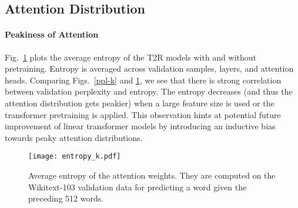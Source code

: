 \documentclass[11pt,a4paper]{article}
\newcommand{\TRNN}{T2R\xspace}
\begin{document}
\subsection{Attention Distribution}
\paragraph{Peakiness of Attention}
Fig.\ \ref{fig:entropy-kernel} plots the average entropy of the \TRNN models with and without pretraining.
Entropy is averaged across validation samples, layers, and attention heads.
Comparing Figs.\ \ref{ppl-k} and \ref{fig:entropy-kernel}, we see that there is strong correlation between validation perplexity and entropy.
The entropy decreases (and thus the attention distribution gets peakier) when a large feature size is used or the transformer pretraining is applied.
This observation hints at potential future improvement of linear transformer models by introducing an inductive bias towards peaky attention distributions.

\begin{figure}[h]
\centering
    \texttt{[image: entropy\_k.pdf]}
\caption{Average entropy of the attention weights. They are computed on the Wikitext-103 validation data for predicting a word given the preceding 512 words.}
\label{fig:entropy-kernel}
\end{figure}
\end{document}
